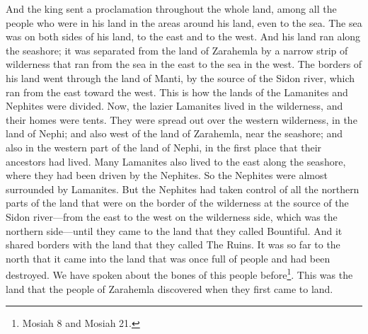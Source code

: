 And the king sent a proclamation throughout the whole land, among all the people who were in his land in the areas around his land, even to the sea. The sea was on both sides of his land, to the east and to the west. And his land ran along the seashore; it was separated from the land of Zarahemla by a narrow strip of wilderness that ran from the sea in the east to the sea in the west. The borders of his land went through the land of Manti, by the source of the Sidon river, which ran from the east toward the west. This is how the lands of the Lamanites and Nephites were divided.
\bverse \iffalse Now, the more idle part of the Lamanites lived in the wilderness, and dwelt in tents; and they were spread through the wilderness on the west, in the land of Nephi; yea, and also on the west of the land of Zarahemla, in the borders by the seashore, and on the west in the land of Nephi, in the place of their fathers' first inheritance, and thus bordering along by the seashore. \fi
Now, the lazier Lamanites lived in the wilderness, and their homes were tents. They were spread out over the western wilderness, in the land of Nephi; and also west of the land of Zarahemla, near the seashore; and also in the western part of the land of Nephi, in the first place that their ancestors had lived. 
\bverse \iffalse And also there were many Lamanites on the east by the seashore, whither the Nephites had driven them. And thus the Nephites were nearly surrounded by the Lamanites; nevertheless the Nephites had taken possession of all the northern parts of the land bordering on the wilderness, at the head of the river Sidon, from the east to the west, round about on the wilderness side; on the north, even until they came to the land which they called Bountiful. \fi
Many Lamanites also lived to the east along the seashore, where they had been driven by the Nephites. So the Nephites were almost surrounded by Lamanites. But the Nephites had taken control of all the northern parts of the land that were on the border of the wilderness at the source of the Sidon river---from the east to the west on the wilderness side, which was the northern side---until they came to the land that they called Bountiful.
\bverse \iffalse And it bordered upon the land which they called Desolation, it being so far northward that it came into the land which had been peopled and been destroyed, of whose bones we have spoken, which was discovered by the people of Zarahemla, it being the place of their first landing. \fi
And it shared borders with the land that they called The Ruins. It was so far to the north that it came into the land that was once full of people and had been destroyed. We have spoken about the bones of this people before\footnote{Mosiah 8 and Mosiah 21.}. This was the land that the people of Zarahemla discovered when they first came to land.
